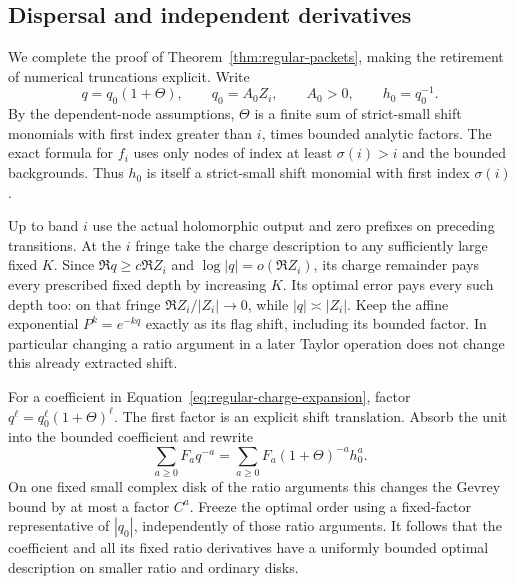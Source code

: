 \subsection{Dispersal and independent derivatives}

We complete the proof of Theorem~\ref{thm:regular-packets}, making
the retirement of numerical truncations explicit.  Write
\begin{equation}\label{eq:regular-rate-split}
 q=q_0(1+\Theta),\qquad q_0=A_0Z_i,\qquad A_0>0,
 \qquad h_0=q_0^{-1}.
\end{equation}
By the dependent-node assumptions, $\Theta$ is a finite sum of
strict-small shift monomials with first index greater than $i$,
times bounded analytic factors.  The exact formula for $f_i$
uses only nodes of index at least $\sigma(i)>i$ and the bounded
backgrounds.  Thus $h_0$ is itself a strict-small shift monomial
with first index $\sigma(i)$.

Up to band $i$ use the actual holomorphic output and zero prefixes
on preceding transitions.  At the $i$ fringe take the charge
description to any sufficiently large fixed $K$.  Since
$\Re q\ge c\Re Z_i$ and $\log|q|=o(\Re Z_i)$, its charge
remainder pays every prescribed fixed depth by increasing $K$.
Its optimal error pays every such depth too: on that fringe
$\Re Z_i/|Z_i|\to0$, while $|q|\asymp|Z_i|$.  Keep the affine
exponential $P^k=e^{-kq}$ exactly as its flag shift, including its
bounded factor.  In particular changing a ratio argument in a later
Taylor operation does not change this already extracted shift.

For a coefficient in Equation~\eqref{eq:regular-charge-expansion}, factor
$q^\ell=q_0^\ell(1+\Theta)^\ell$.  The first factor is an
explicit shift translation.  Absorb the unit into the bounded
coefficient and rewrite
\[
 \sum_{a\ge0}F_aq^{-a}
       =\sum_{a\ge0}F_a(1+\Theta)^{-a}h_0^a.
\]
On one fixed small complex disk of the ratio arguments this changes
the Gevrey bound by at most a factor $C^a$.  Freeze the optimal
order using a fixed-factor representative of $|q_0|$, independently
of those ratio arguments.  It follows that the coefficient and all
its fixed ratio derivatives have a uniformly bounded optimal
description on smaller ratio and ordinary disks.

